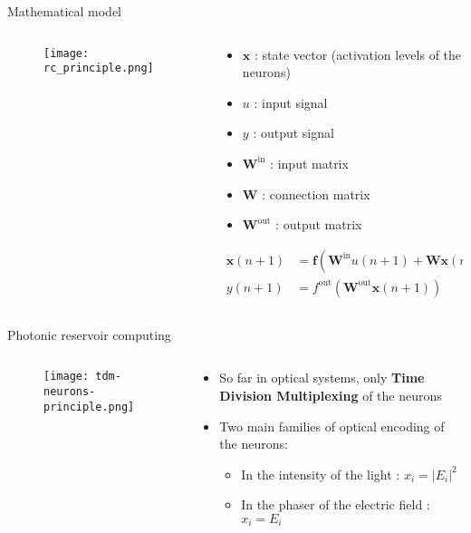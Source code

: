 \begin{frame}{Mathematical model}

	\begin{columns}
		\begin{column}{.5\textwidth}
			\begin{figure}
				\centering
				\texttt{[image: rc\_principle.png]}
				\caption{\cite{financialTimeSeries}}
			\end{figure}
		\end{column}%
		\begin{column}{.5\textwidth}
			\begin{itemize}
				\item $\mathbf{x}$ : state vector (activation levels of the neurons)
				\item $u$ : input signal
				\item $y$ : output signal
				\item $\mathbf{W}^{\text{in}}$ : input matrix
				\item $\mathbf{W}$ : connection matrix
				\item $\mathbf{W}^{\text{out}}$ : output matrix
			\end{itemize}
			\begin{alertblock}{}
				\begin{align}
				\mathbf{x}(n+1) &= \mathbf{f} \left( \mathbf{W}^{\text{in}} u(n+1) + \mathbf{W} \mathbf{x}(n) \right) \nonumber \\
				y(n+1) &= f^{\text{out}}\left( \mathbf{W}^{\text{out}} \mathbf{x}(n+1) \right) \nonumber
			\end{align}
			\end{alertblock}
		\end{column}
	\end{columns}

\end{frame}

\begin{frame}{Photonic reservoir computing}
	\begin{columns}
		\begin{column}{.5\textwidth}
			\begin{figure}
				\centering
				\texttt{[image: tdm-neurons-principle.png]}
			\end{figure}
		\end{column}%
		\begin{column}{.5\textwidth}
			\begin{itemize}
				\item So far in optical systems, only \textbf{Time Division Multiplexing} of the neurons
				\item Two main families of optical encoding of the neurons:
				\begin{itemize}
					\item In the intensity of the light : $x_i = |E_i|^2$
					\item In the phaser of the electric field : $x_i = E_i$
				\end{itemize}
			\end{itemize}
		\end{column}
	\end{columns}
\end{frame}


